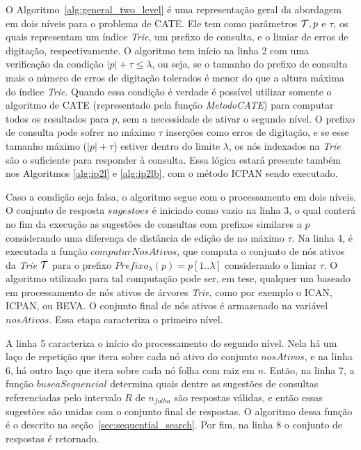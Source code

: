 O Algoritmo~\ref{alg:general_two_level} é uma representação geral da abordagem em dois níveis para o problema de CATE. Ele tem como parâmetros $\mathcal{T}, p$ e $\tau$, os quais representam um índice \textit{Trie}, um prefixo de consulta, e o limiar de erros de digitação, respectivamente. O algoritmo tem início na linha 2 com uma verificação da condição $|p| + \tau \leq \lambda$, ou seja, se o tamanho do prefixo de consulta mais o número de erros de digitação tolerados é menor do que a altura máxima do índice \textit{Trie}.
Quando essa condição é verdade é possível utilizar somente o algoritmo de CATE (representado pela função \textit{MetodoCATE}) para computar todos os resultados para $p$, sem a necessidade de ativar o segundo nível. O prefixo de consulta pode sofrer no máximo $\tau$ inserções como erros de digitação, e se esse tamanho máximo ($|p| + \tau$) estiver dentro do limite $\lambda$, os nós indexados na \textit{Trie} são o suficiente para responder à consulta. Essa lógica estará presente também nos Algoritmos \ref{alg:ip2l} e \ref{alg:ip2lb}, com o método ICPAN sendo executado.

Caso a condição seja falsa, o algoritmo segue com o processamento em dois níveis. O conjunto de resposta $sugestoes$ é iniciado como vazio na linha 3, o qual conterá no fim da execução as sugestões de consultas com prefixos similares a $p$ considerando uma diferença de distância de edição de no máximo $\tau$. Na linha 4, é executada a função $computarNosAtivos$, que computa o conjunto de nós ativos da \textit{Trie} $\mathcal{T}$ para o prefixo $Prefixo_{\lambda}(p) = p[1..\lambda]$ considerando o limiar $\tau$. O algoritmo utilizado para tal computação pode ser, em tese, qualquer um baseado em processamento de nós ativos de árvores \textit{Trie}, como por exemplo o ICAN, ICPAN, ou BEVA. O conjunto final de nós ativos é armazenado na variável $nosAtivos$. Essa etapa caracteriza o primeiro nível. 

A linha 5 caracteriza o início do processamento do segundo nível. Nela há um laço de repetição que itera sobre cada nó ativo do conjunto $nosAtivos$, e na linha 6, há outro laço que itera sobre cada nó folha com raiz em $n$. Então, na linha 7, a função $buscaSequencial$ determina quais dentre as sugestões de consultas referenciadas pelo intervalo $R$ de $n_{folha}$ são respostas válidas, e então essas sugestões são unidas com o conjunto final de respostas. O algoritmo dessa função é o descrito na seção~\ref{sec:sequential_search}. Por fim, na linha 8 o conjunto de respostas é retornado.



